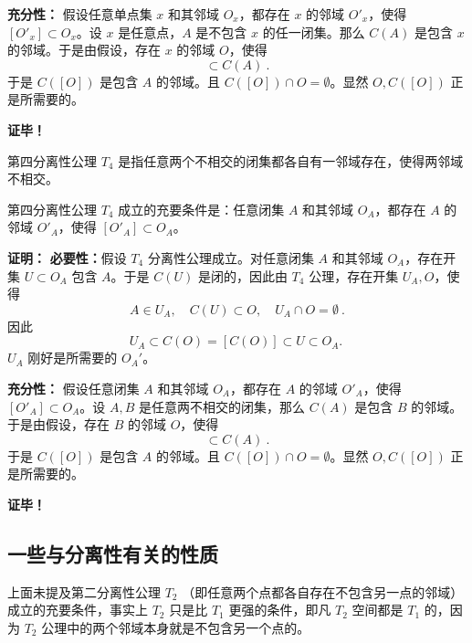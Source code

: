 \textbf{充分性：} 假设任意单点集 $x$ 和其邻域 $O_x$，都存在 $x$ 的邻域 $ O'_x$，使得 $[O'_x]\subset O_x$。设 $x$ 是任意点，$A$ 是不包含 $x$ 的任一闭集。那么 $C(A)$ 是包含 $x$ 的邻域。于是由假设，存在 $x$ 的邻域 $O$，使得 
\begin{equation}
[O]\subset C(A)~.
\end{equation}
于是 $C([O])$ 是包含 $A$ 的邻域。且 $C([O])\cap O=\emptyset $。显然 $O,C([O])$ 正是所需要的。

\textbf{证毕！}


第四分离性公理 $T_4$ 是指任意两个不相交的闭集都各自有一邻域存在，使得两邻域不相交。

\begin{theorem}{}
第四分离性公理 $T_4$ 成立的充要条件是：任意闭集 $A$ 和其邻域 $O_A$，都存在 $A$ 的邻域 $ O'_A$，使得 $[O'_A]\subset O_A$。
\end{theorem}

\textbf{证明：}
\textbf{必要性：}假设 $T_4$ 分离性公理成立。对任意闭集 $A$ 和其邻域 $O_A$，存在开集 $U\subset O_A$ 包含 $A$。于是 $C(U)$ 是闭的，因此由 $T_4$ 公理，存在开集 $U_A, O$，使得
\begin{equation}
A\in U_A,\quad C(U)\subset O,\quad U_A\cap O=\emptyset~.
\end{equation}
因此
\begin{equation}
U_A\subset C(O)=[C(O)]\subset U\subset O_A.~
\end{equation}
$U_A$ 刚好是所需要的 $O_A'$。

\textbf{充分性：} 假设任意闭集 $A$ 和其邻域 $O_A$，都存在 $A$ 的邻域 $ O'_A$，使得 $[O'_A]\subset O_A$。设 $A,B$ 是任意两不相交的闭集，那么 $C(A)$ 是包含 $B$ 的邻域。于是由假设，存在 $B$ 的邻域 $O$，使得 
\begin{equation}
[O]\subset C(A)~.
\end{equation}
于是 $C([O])$ 是包含 $A$ 的邻域。且 $C([O])\cap O=\emptyset $。显然 $O,C([O])$ 正是所需要的。

\textbf{证毕！}


\subsection{一些与分离性有关的性质}

上面未提及第二分离性公理 $T_2$ （即任意两个点都各自存在不包含另一点的邻域）成立的充要条件，事实上 $T_2$ 只是比 $T_1$ 更强的条件，即凡 $T_2$ 空间都是 $T_1$ 的，因为 $T_2$ 公理中的两个邻域本身就是不包含另一个点的。

\
\begin{theorem}{}

\end{theorem}








